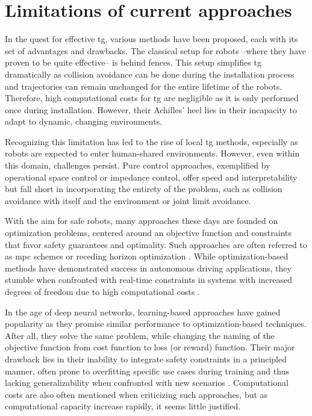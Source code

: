\section{Limitations of current approaches}

In the quest for effective \ac{tg}, various
methods have been proposed, each with its set of advantages and
drawbacks.
The classical setup for robots --where they have
proven to be quite effective-- is behind fences. This setup
simplifies \ac{tg} dramatically as collision
avoidance can be done during the installation process and
trajectories can remain unchanged for the entire lifetime of
the robots. Therefore, high computational costs for
\ac{tg} are negligible as it is only performed
once during installation. However, their Achilles' heel lies
in their incapacity to adapt to dynamic, changing
environments.

Recognizing this limitation has led to the rise of local
\ac{tg} methods, especially as robots are
expected to enter human-shared environments. However, even
within this domain, challenges persist. Pure control
approaches, exemplified by operational space control or
impedance control, offer speed and interpretability but fall
short in incorporating the entirety of the problem, such as
collision avoidance with itself and the environment or
joint limit avoidance.

With the aim for safe robots, many approaches these days are
founded on optimization problems, centered around an
objective function and constraints that favor safety
guarantees and optimality. Such approaches are often
referred to as \ac{mpc} schemes or receding
horizon optimization \cite{hewing2020learning}. While
optimization-based methods have demonstrated success in
autonomous driving applications, they stumble when
confronted with real-time constraints in systems with
increased degrees of freedom due to high computational costs
\cite{spahn2021coupled}.

In the age of deep neural networks, learning-based
approaches have gained popularity as they promise similar
performance to optimization-based techniques. After all,
they solve the same problem, while changing the naming of
the objective function from cost function to loss (or
reward) function. Their major drawback lies in their
inability to integrate safety constraints in a principled
manner, often prone to overfitting specific use cases during
training and thus lacking generalizability when confronted
with new scenarios \cite{noroozi2023conventional}.
Computational costs are also often
mentioned when criticizing such approaches, but as
computational capacity increase rapidly, it seems little
justified. 


